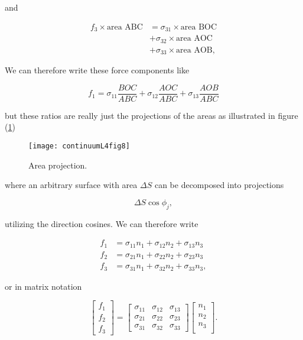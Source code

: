 and

\begin{equation}\label{eqn:continuumL4:290}
\begin{aligned}
f_3 \times \text{area ABC} 
&= 
\sigma_{31} \times \text{area BOC} \\
&+\sigma_{32} \times \text{area AOC} \\
&+\sigma_{33} \times \text{area AOB},
\end{aligned}
\end{equation}

We can therefore write these force components like

\begin{equation}\label{eqn:continuumL4:310}
f_1 = 
\sigma_{11} \frac{BOC}{ABC} + 
\sigma_{12} \frac{AOC}{ABC} + 
\sigma_{13} \frac{AOB}{ABC} 
\end{equation}

but these ratios are really just the projections of the areas as illustrated in figure (\ref{fig:continuumL4:continuumL4fig8})

\begin{figure}[htp]
   \centering
   \texttt{[image: continuumL4fig8]}
   \caption{Area projection.}\label{fig:continuumL4:continuumL4fig8}
\end{figure}

where an arbitrary surface with area $\Delta S$ can be decomposed into projections

\begin{equation}\label{eqn:continuumL4:330}
\Delta S \cos\phi_j,
\end{equation}

utilizing the direction cosines.  We can therefore write

\begin{align}\label{eqn:continuumL4:350}
f_1 &= \sigma_{11} n_1 + \sigma_{12} n_2 + \sigma_{13} n_3 \\
f_2 &= \sigma_{21} n_1 + \sigma_{22} n_2 + \sigma_{23} n_3 \\
f_3 &= \sigma_{31} n_1 + \sigma_{32} n_2 + \sigma_{33} n_3,
\end{align}

or in matrix notation

\begin{equation}\label{eqn:continuumL4:370}
\begin{bmatrix}
f_1  \\
f_2  \\
f_3 
\end{bmatrix}
=
\begin{bmatrix}
\sigma_{11} & \sigma_{12} & \sigma_{13} \\
\sigma_{21} & \sigma_{22} & \sigma_{23} \\
\sigma_{31} & \sigma_{32} & \sigma_{33} 
\end{bmatrix}
\begin{bmatrix}
n_1 \\
n_2 \\
n_3 \\
\end{bmatrix}.
\end{equation}

